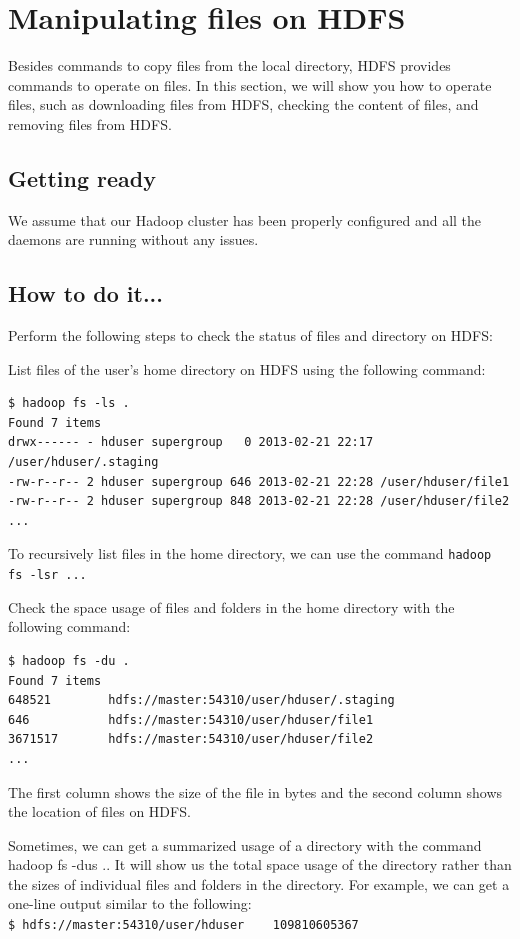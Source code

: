 \section{Manipulating files on HDFS}
Besides commands to copy files from the local directory, HDFS provides commands to operate on files. In this section, we will show you how to operate files, such as downloading files from HDFS, checking the content of files, and removing files from HDFS.
\subsection*{Getting ready}
We assume that our Hadoop cluster has been properly configured and all the daemons are running without any issues.
\subsection*{How to do it...}
Perform the following steps to check the status of files and directory on HDFS:

List files of the user's home directory on HDFS using the following command:
\lstset{style=bashstyle}
\begin{lstlisting}
$ hadoop fs -ls .
Found 7 items
drwx------ - hduser supergroup   0 2013-02-21 22:17 /user/hduser/.staging
-rw-r--r-- 2 hduser supergroup 646 2013-02-21 22:28 /user/hduser/file1
-rw-r--r-- 2 hduser supergroup 848 2013-02-21 22:28 /user/hduser/file2
...
\end{lstlisting}

To recursively list files in the home directory, we can use the command \verb|hadoop fs -lsr ...|

Check the space usage of files and folders in the home directory with the following command:
\lstset{style=bashstyle}
\begin{lstlisting}
$ hadoop fs -du .
Found 7 items
648521        hdfs://master:54310/user/hduser/.staging
646           hdfs://master:54310/user/hduser/file1
3671517       hdfs://master:54310/user/hduser/file2
...
\end{lstlisting}

The first column shows the size of the file in bytes and the second column shows the location of files on HDFS.

Sometimes, we can get a summarized usage of a directory with the command hadoop fs -dus .. It will show us the total space usage of the directory rather than the sizes of individual files and folders in the directory. For example, we can get a one-line output similar to the following: \\
\verb|$ hdfs://master:54310/user/hduser    109810605367|

